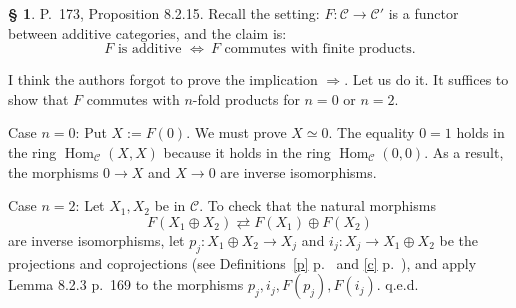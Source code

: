 \documentclass[12pt]{article}
\theoremstyle{remark}
\theoremstyle{definition}
\newtheorem{s}[thm]{\S}
\newcommand{\C}{\mathcal C}
\newcommand{\then}{\Rightarrow}
\newcommand{\ssi}{\Leftrightarrow}%
\DeclareMathOperator{\Hom}{Hom}%
\begin{document}
%
\begin{s} 
P.~173, Proposition 8.2.15. Recall the setting: $F:\C\to\C'$ is a functor between additive categories, and the claim is: 
$$
F\text{ is additive }\ssi\ F\text{ commutes with finite products}.
$$ 

I think the authors forgot to prove the implication $\then$. Let us do it. It suffices to show that $F$ commutes with $n$-fold products for $n=0$ or $n=2$. 

Case $n=0$: Put $X:=F(0)$. We must prove $X\simeq 0$. The equality $0=1$ holds in the ring $\Hom_\C(X,X)$ because it holds in the ring $\Hom_\C(0,0)$. As a result, the morphisms $0\to X$ and $X\to 0$ are inverse isomorphisms. 

Case $n=2$: Let $X_1,X_2$ be in $\C$. To check that the natural morphisms 
%
\begin{equation}\label{173} 
F(X_1\oplus X_2)\rightleftarrows F(X_1)\oplus F(X_2)
\end{equation} 
%
are inverse isomorphisms, let $p_j:X_1\oplus X_2\to X_j$ and $i_j:X_j\to X_1\oplus X_2$ be the projections and coprojections (see Definitions~\ref{p} p.~\pageref{p} and \ref{c} p.~\pageref{c}), and apply Lemma 8.2.3 p.~169 to the morphisms $p_j,i_j,F(p_j),F(i_j)$. q.e.d.
\end{s}
%
%
\end{document}
